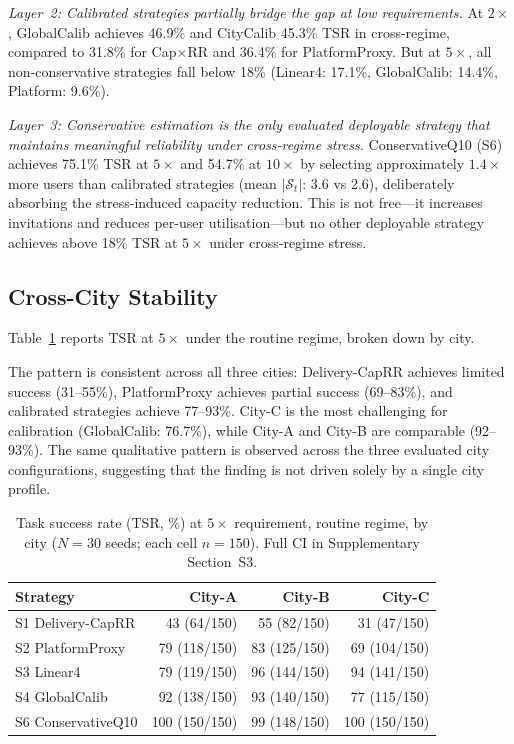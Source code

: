 \documentclass[utf8]{FrontiersinHarvard}
\begin{document}
\textit{Layer~2: Calibrated strategies partially bridge the gap
at low requirements.} At $2\times$, GlobalCalib achieves 46.9\%
and CityCalib 45.3\% TSR in cross-regime, compared to 31.8\% for
Cap$\times$RR and 36.4\% for PlatformProxy. But at $5\times$,
all non-conservative strategies fall below 18\%
(Linear4: 17.1\%, GlobalCalib: 14.4\%, Platform: 9.6\%).

\textit{Layer~3: Conservative estimation is the only evaluated
deployable strategy that maintains meaningful reliability under
cross-regime stress.} ConservativeQ10 (S6) achieves 75.1\% TSR
at $5\times$ and 54.7\% at $10\times$ by selecting approximately
$1.4\times$ more users than calibrated strategies (mean
$|\mathcal{S}_t|$: 3.6 vs 2.6), deliberately absorbing the
stress-induced capacity reduction. This is not free---it increases
invitations and reduces per-user utilisation---but no other
deployable strategy achieves above 18\% TSR at $5\times$ under
cross-regime stress.

\subsection{Cross-City Stability}

Table~\ref{tab:cross_city} reports TSR at $5\times$ under the
routine regime, broken down by city.

The pattern is consistent across all three cities: Delivery-CapRR
achieves limited success (31--55\%), PlatformProxy achieves
partial success (69--83\%), and calibrated strategies achieve
77--93\%. City-C is the most challenging for calibration
(GlobalCalib: 76.7\%), while City-A and City-B are comparable
(92--93\%). The same qualitative
pattern is observed across the three evaluated city configurations, suggesting that the finding is not driven solely by a single city profile.

\begin{table}[h!]
\centering
\caption{Task success rate (TSR, \%) at $5\times$ requirement,
routine regime, by city ($N=30$ seeds; each cell $n=150$).
Full CI in Supplementary Section~S3.}
\label{tab:cross_city}
\begin{tabular}{lrrr}
\toprule
\textbf{Strategy} & \textbf{City-A} & \textbf{City-B}
& \textbf{City-C} \\
\midrule
S1 Delivery-CapRR & 43 (64/150) & 55 (82/150) & 31 (47/150) \\
S2 PlatformProxy & 79 (118/150) & 83 (125/150) & 69 (104/150) \\
S3 Linear4 & 79 (119/150) & 96 (144/150) & 94 (141/150) \\
S4 GlobalCalib & 92 (138/150) & 93 (140/150) & 77 (115/150) \\
S6 ConservativeQ10 & 100 (150/150) & 99 (148/150) & 100 (150/150) \\
\bottomrule
\end{tabular}
\end{table}
\end{document}

